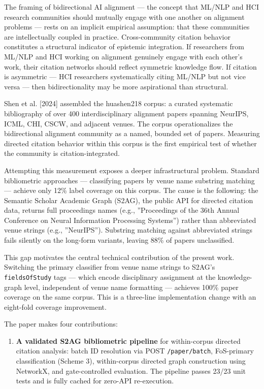 
The framing of bidirectional AI alignment --- the concept that ML/NLP and HCI research communities should mutually engage with one another on alignment problems --- rests on an implicit empirical assumption: that these communities are intellectually coupled in practice. Cross-community citation behavior constitutes a structural indicator of epistemic integration. If researchers from ML/NLP and HCI working on alignment genuinely engage with each other's work, their citation networks should reflect symmetric knowledge flow. If citation is asymmetric --- HCI researchers systematically citing ML/NLP but not vice versa --- then bidirectionality may be more aspirational than structural.

Shen et al. [2024] assembled the huashen218 corpus: a curated systematic bibliography of over 400 interdisciplinary alignment papers spanning NeurIPS, ICML, CHI, CSCW, and adjacent venues. The corpus operationalizes the bidirectional alignment community as a named, bounded set of papers. Measuring directed citation behavior within this corpus is the first empirical test of whether the community is citation-integrated.

Attempting this measurement exposes a deeper infrastructural problem. Standard bibliometric approaches --- classifying papers by venue name substring matching --- achieve only 12\% label coverage on this corpus. The cause is the following: the Semantic Scholar Academic Graph (S2AG), the public API for directed citation data, returns full proceedings names (e.g., ''Proceedings of the 36th Annual Conference on Neural Information Processing Systems'') rather than abbreviated venue strings (e.g., ''NeurIPS''). Substring matching against abbreviated strings fails silently on the long-form variants, leaving 88\% of papers unclassified.

This gap motivates the central technical contribution of the present work. Switching the primary classifier from venue name strings to S2AG's \texttt{fieldsOfStudy} tags --- which encode disciplinary assignment at the knowledge-graph level, independent of venue name formatting --- achieves 100\% paper coverage on the same corpus. This is a three-line implementation change with an eight-fold coverage improvement.

The paper makes four contributions:

\begin{enumerate}
\item \textbf{A validated S2AG bibliometric pipeline} for within-corpus directed citation analysis: batch ID resolution via POST \texttt{/paper/batch}, FoS-primary classification (Scheme 3), within-corpus directed graph construction using NetworkX, and gate-controlled evaluation. The pipeline passes 23/23 unit tests and is fully cached for zero-API re-execution.
\end{enumerate}

